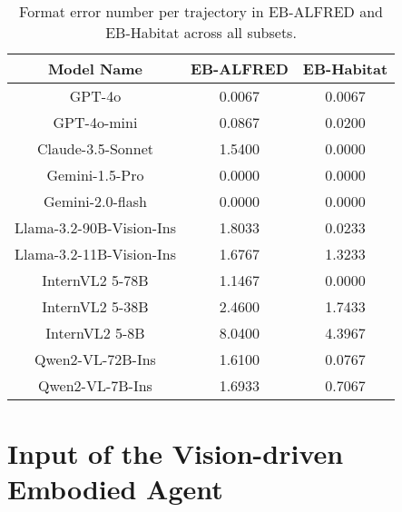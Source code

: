 \begin{table}[h]
    \centering
    \begin{tabular}{c|cc}
    \toprule
    Model Name & EB-ALFRED   &  EB-Habitat \\
    \midrule
       GPT-4o  & 0.0067 & 0.0067 \\
       GPT-4o-mini &  0.0867 & 0.0200 \\
       Claude-3.5-Sonnet  &  1.5400  & 0.0000 \\
       Gemini-1.5-Pro &  0.0000 & 0.0000 \\
       Gemini-2.0-flash & 0.0000 & 0.0000 \\
       Llama-3.2-90B-Vision-Ins &  1.8033 & 0.0233 \\
       Llama-3.2-11B-Vision-Ins &  1.6767  & 1.3233 \\
       InternVL2 5-78B & 1.1467 & 0.0000 \\
       InternVL2 5-38B & 2.4600 & 1.7433 \\
       InternVL2 5-8B & 8.0400 & 4.3967 \\
       Qwen2-VL-72B-Ins & 1.6100 & 0.0767 \\
       Qwen2-VL-7B-Ins &  1.6933 & 0.7067 \\
       \bottomrule
    \end{tabular}
    \caption{Format error number per trajectory in EB-ALFRED and EB-Habitat across all subsets.}
    \label{tab:format_error}
\end{table}



\newpage
\section{Input of the Vision-driven Embodied Agent}
\label{ap:planner_input_examples}
